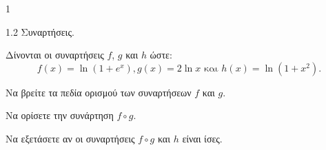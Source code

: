 \begin{ylh}{1}
    \item 1.2 Συναρτήσεις.
\end{ylh}
Δίνονται οι συναρτήσεις $f$, $g$ και $h$ ώστε:
\[f(x) = \ln(1+e^x) , g(x) = 2\ln x \text{ και } h(x) = \ln(1+x^2).\]
\begin{alist}
\item Να βρείτε τα πεδία ορισμού των συναρτήσεων $f$ και $g$. 
\item Να ορίσετε την συνάρτηση $f \circ g$. 
\item Να εξετάσετε αν οι συναρτήσεις $f \circ g$ και $h$ είναι ίσες. 
\end{alist}